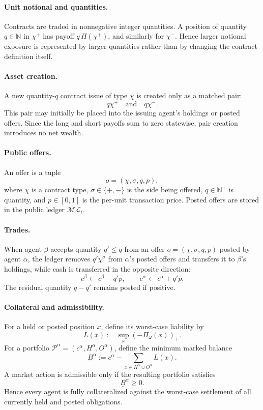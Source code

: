 \documentclass[letterpaper]{article} %
\begin{document}
\paragraph{Unit notional and quantities.}
Contracts are traded in nonnegative integer quantities. A position of quantity $q\in\mathbb N$ in $\chi^+$ has payoff $q\,\Pi(\chi^+)$, and similarly for $\chi^-$. Hence larger notional exposure is represented by larger quantities rather than by changing the contract definition itself.

\paragraph{Asset creation.}
A new quantity-$q$ contract issue of type $\chi$ is created only as a matched pair:
\[
q\chi^+ \quad\text{and}\quad q\chi^-.
\]
This pair may initially be placed into the issuing agent's holdings or posted offers. Since the long and short payoffs sum to zero statewise, pair creation introduces no net wealth.

\paragraph{Public offers.}
An offer is a tuple
\[
o=(\chi,\sigma,q,p),
\]
where $\chi$ is a contract type, $\sigma\in\{+,-\}$ is the side being offered, $q\in\mathbb N^+$ is quantity, and $p\in[0,1]$ is the per-unit transaction price. Posted offers are stored in the public ledger $\mathcal{ML}_t$.

\paragraph{Trades.}
When agent $\beta$ accepts quantity $q'\le q$ from an offer $o=(\chi,\sigma,q,p)$ posted by agent $\alpha$, the ledger removes $q'\chi^\sigma$ from $\alpha$'s posted offers and transfers it to $\beta$'s holdings, while cash is transferred in the opposite direction:
\[
c^\beta \leftarrow c^\beta - q'p,\qquad c^\alpha \leftarrow c^\alpha + q'p.
\]
The residual quantity $q-q'$ remains posted if positive.

\paragraph{Collateral and admissibility.}
For a held or posted position $x$, define its worst-case liability by
\[
L(x):=\sup_{\omega}(-\Pi_\omega(x))_+.
\]
For a portfolio $\mathcal P^\alpha=(c^\alpha,H^\alpha,O^\alpha)$, define the minimum marked balance
\[
\underline B^\alpha
:=
c^\alpha - \sum_{x\in H^\alpha\cup O^\alpha}L(x).
\]
A market action is admissible only if the resulting portfolio satisfies
\[
\underline B^\alpha \ge 0.
\]
Hence every agent is fully collateralized against the worst-case settlement of all currently held and posted obligations.
\end{document}
